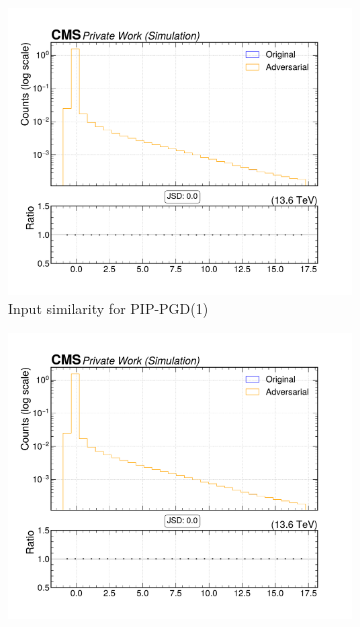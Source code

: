 \begin{figure}[htbp]
  \centering
  \begin{subfigure}[t]{0.32\textwidth}
    \includegraphics[width=\linewidth]{media/output/features/compare/combined_it_1/cmp_cpf_arr_Cpfcan_BtagPf_trackSip3dVal.pdf}
    \caption*{Input similarity for PIP-PGD(1)}
  \end{subfigure}\hfill
  \begin{subfigure}[t]{0.32\textwidth}
    \includegraphics[width=\linewidth]{media/output/features/compare/combined_it_2/cmp_cpf_arr_Cpfcan_BtagPf_trackSip3dVal.pdf}

\end{subfigure}
\end{figure}
